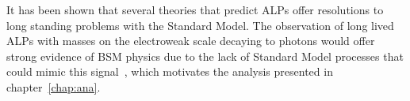 It has been shown that several theories that predict ALPs offer resolutions to long standing problems with the Standard Model. The observation of long lived ALPs with masses on the electroweak scale decaying to photons would offer strong evidence of BSM physics due to the lack of Standard Model processes that could mimic this signal~\cite{Curtin_2014}, which motivates the analysis presented in chapter~\ref{chap:ana}.